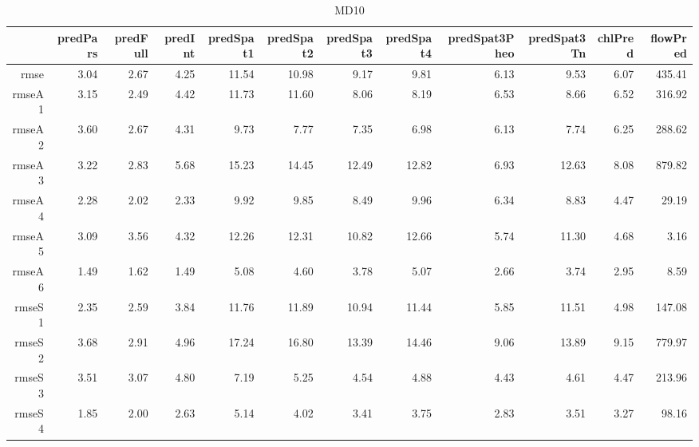 \begin{table}[H]
\centering
\begingroup\fontsize{2.5pt}{4pt}\selectfont
\begin{tabular}{rrrrrrrrrrrr}
  \hline
 & predPars & predFull & predInt & predSpat1 & predSpat2 & predSpat3 & predSpat4 & predSpat3Pheo & predSpat3Tn & chlPred & flowPred \\ 
  \hline
rmse & 3.04 & 2.67 & 4.25 & 11.54 & 10.98 & 9.17 & 9.81 & 6.13 & 9.53 & 6.07 & 435.41 \\ 
  rmseA1 & 3.15 & 2.49 & 4.42 & 11.73 & 11.60 & 8.06 & 8.19 & 6.53 & 8.66 & 6.52 & 316.92 \\ 
  rmseA2 & 3.60 & 2.67 & 4.31 & 9.73 & 7.77 & 7.35 & 6.98 & 6.13 & 7.74 & 6.25 & 288.62 \\ 
  rmseA3 & 3.22 & 2.83 & 5.68 & 15.23 & 14.45 & 12.49 & 12.82 & 6.93 & 12.63 & 8.08 & 879.82 \\ 
  rmseA4 & 2.28 & 2.02 & 2.33 & 9.92 & 9.85 & 8.49 & 9.96 & 6.34 & 8.83 & 4.47 & 29.19 \\ 
  rmseA5 & 3.09 & 3.56 & 4.32 & 12.26 & 12.31 & 10.82 & 12.66 & 5.74 & 11.30 & 4.68 & 3.16 \\ 
  rmseA6 & 1.49 & 1.62 & 1.49 & 5.08 & 4.60 & 3.78 & 5.07 & 2.66 & 3.74 & 2.95 & 8.59 \\ 
  rmseS1 & 2.35 & 2.59 & 3.84 & 11.76 & 11.89 & 10.94 & 11.44 & 5.85 & 11.51 & 4.98 & 147.08 \\ 
  rmseS2 & 3.68 & 2.91 & 4.96 & 17.24 & 16.80 & 13.39 & 14.46 & 9.06 & 13.89 & 9.15 & 779.97 \\ 
  rmseS3 & 3.51 & 3.07 & 4.80 & 7.19 & 5.25 & 4.54 & 4.88 & 4.43 & 4.61 & 4.47 & 213.96 \\ 
  rmseS4 & 1.85 & 2.00 & 2.63 & 5.14 & 4.02 & 3.41 & 3.75 & 2.83 & 3.51 & 3.27 & 98.16 \\ 
   \hline
\end{tabular}
\endgroup
\caption{MD10} 
\end{table}
